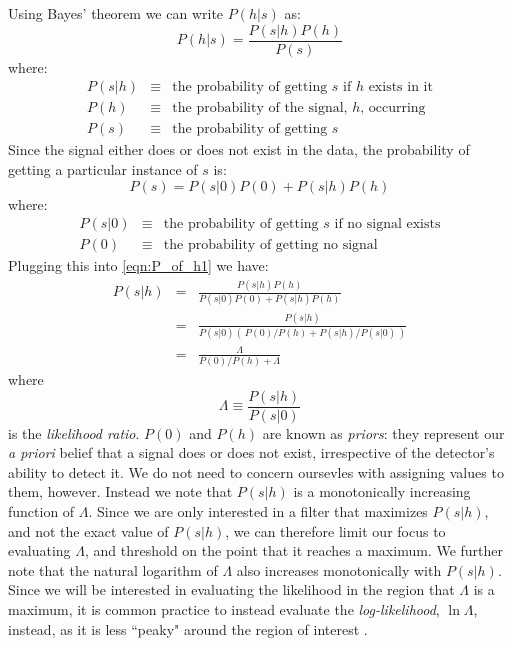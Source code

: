 Using Bayes' theorem \cite{ref:Sivia} we can write $P(h|s)$ as:
\begin{equation}
\label{eqn:P_of_h1}
P(h|s) = \frac{P(s|h) P(h)}{P(s)}
\end{equation}
where:
\begin{eqnarray}
P(s|h) & \equiv & \mbox{the probability of getting $s$ if $h$ exists in it} \nonumber \\
P(h)   & \equiv & \mbox{the probability of the signal, $h$, occurring} \nonumber \\
P(s)   & \equiv & \mbox{the probability of getting $s$} \nonumber
\end{eqnarray}
Since the signal either does or does not exist in the data, the probability of getting a particular instance of $s$ is:
\begin{equation}
P(s) = P(s|0)P(0) + P(s|h)P(h)
\end{equation}
where:
\begin{eqnarray}
P(s|0) & \equiv & \mbox{the probability of getting $s$ if no signal exists} \nonumber \\
P(0) & \equiv & \mbox{the probability of getting no signal} \nonumber
\end{eqnarray}
Plugging this into \ref{eqn:P_of_h1} we have:
\begin{eqnarray}
\label{eqn:P_of_h}
P(s|h) & = & \frac{ P(s|h) P(h) }{ P(s|0)P(0) + P(s|h)P(h) } \nonumber \\
 & = & \frac{ P(s|h) } { P(s|0) \left(\, P(0)/P(h) + P(s|h)/P(s|0) \,\right) } \nonumber \\
 & = & \frac{ \Lambda }{ P(0)/P(h) + \Lambda }
\end{eqnarray}
where
\begin{equation}
\label{eqn:likelihood_ratio}
\Lambda \equiv \frac{ P(s|h) }{ P(s|0) }
\end{equation}
is the \emph{likelihood ratio}. $P(0)$ and $P(h)$ are known as \emph{priors}: they represent our \emph{a priori} belief that a signal does or does not exist, irrespective of the detector's ability to detect it. We do not need to concern oursevles with assigning values to them, however. Instead we note that $P(s|h)$ is a monotonically increasing function of $\Lambda$. Since we are only interested in a filter that maximizes $P(s|h)$, and not the exact value of $P(s|h)$, we can therefore limit our focus to evaluating $\Lambda$, and threshold on the point that it reaches a maximum. We further note that the natural logarithm of $\Lambda$ also increases monotonically with $P(s|h)$. Since we will be interested in evaluating the likelihood in the region that $\Lambda$ is a maximum, it is common practice to instead evaluate the \emph{log-likelihood}, $\ln \Lambda$, instead, as it is less ``peaky" around the region of interest \cite{ref:Sivia}.

